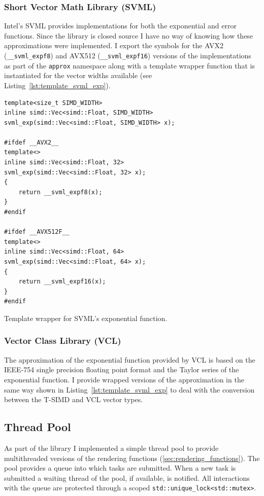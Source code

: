 \documentclass[a4paper, 11pt]{memoir}
\begin{document}
    \subsubsection{Short Vector Math Library (SVML)}
    \label{sec:svml}
    Intel's SVML provides implementations for both the exponential and error functions. Since the library is closed source I have no way of knowing how these approximations were implemented.
    I export the symbols for the AVX2 (\texttt{__svml_expf8}) and AVX512 (\texttt{__svml_expf16}) versions of the implementations as part of the \texttt{approx}
    namespace along with a template wrapper function that is instantiated for the vector widths available (see Listing~\ref{lst:template_svml_exp}).

    \begin{listing}[H]
        \begin{verbatim}
template<size_t SIMD_WIDTH>
inline simd::Vec<simd::Float, SIMD_WIDTH>
svml_exp(simd::Vec<simd::Float, SIMD_WIDTH> x);

#ifdef __AVX2__
template<>
inline simd::Vec<simd::Float, 32>
svml_exp(simd::Vec<simd::Float, 32> x);
{
    return __svml_expf8(x);
}
#endif

#ifdef __AVX512F__
template<>
inline simd::Vec<simd::Float, 64>
svml_exp(simd::Vec<simd::Float, 64> x);
{
    return __svml_expf16(x);
}
#endif
        \end{verbatim}
        \caption{Template wrapper for SVML's exponential function.}
        \label{lst:template_svml_exp}
    \end{listing}

    \subsubsection{Vector Class Library (VCL)}
    \label{sec:vcl}
    The approximation of the exponential function provided by VCL is based on the IEEE-754 single precision floating point format and the Taylor series of the exponential function.
    I provide wrapped versions of the approximation in the same way shown in Listing~\ref{lst:template_svml_exp} to deal with the conversion between the T-SIMD and VCL vector types.

    \subsection{Thread Pool}
    \label{sec:thread_pool}
    As part of the library I implemented a simple thread pool to provide multithreaded versions of the rendering functions (\ref{sec:rendering_functions}).
    The pool provides a queue into which tasks are submitted. When a new task is submitted a waiting thread of the pool, if available, is notified.
    All interactions with the queue are protected through a scoped \texttt{std::unique_lock<std::mutex>}.
\end{document}
